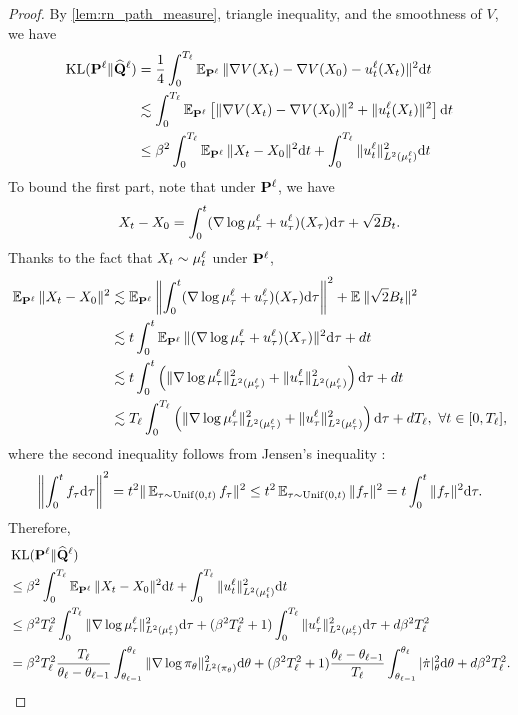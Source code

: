 \begin{proof}
    By \cref{lem:rn_path_measure}, triangle inequality, and the smoothness of $V$, we have
    \begin{align*}
        \operatorname{KL}(\mathbf{P}^\ell\|{\mathbf{\widehat{Q}}}^\ell) & =\frac{1}{4}\int_0^{T_\ell}\operatorname{\mathbb{E}}_{\mathbf{P}^\ell}{\|\nabla V(X_t)-\nabla V(X_0)-u^\ell_t(X_t)\|^2}\mathrm{d} t                \\
                               & \lesssim \int_0^{T_\ell}\operatorname{\mathbb{E}}_{\mathbf{P}^\ell}\left[\|\nabla V(X_t)-\nabla V(X_0)\|^2+\|u^\ell_t(X_t)\|^2\right]\mathrm{d} t       \\
                               & \le\beta^2\int_0^{T_\ell}\operatorname{\mathbb{E}}_{\mathbf{P}^\ell}{\|X_t-X_0\|^2}\mathrm{d} t+\int_0^{T_\ell}\|u^\ell_t\|_{L^2(\mu^\ell_t)}^2\mathrm{d} t
    \end{align*}
    To bound the first part, note that under $\mathbf{P}^\ell$, we have
    $$X_t-X_0=\int_0^t(\nabla\log\mu^\ell_\tau+u^\ell_\tau)(X_\tau)\mathrm{d}\tau+\sqrt2B_t.$$
    Thanks to the fact that $X_t\sim\mu^\ell_t$ under $\mathbf{P}^\ell$,
    \begin{align*}
        \operatorname{\mathbb{E}}_{\mathbf{P}^\ell}{\|X_t-X_0\|^2} & \lesssim\operatorname{\mathbb{E}}_{\mathbf{P}^\ell}{\left\|\int_0^t(\nabla\log\mu^\ell_\tau+u^\ell_\tau)(X_\tau)\mathrm{d}\tau\right\|^2}+\operatorname{\mathbb{E}}_{}{\|\sqrt2B_t\|^2}                                         \\
                                      & \lesssim t\int_0^t\operatorname{\mathbb{E}}_{\mathbf{P}^\ell}{\|(\nabla\log\mu^\ell_\tau+u^\ell_\tau)(X_\tau)\|^2}\mathrm{d}\tau+dt                                                                \\
                                      & \lesssim t\int_0^t\left(\|\nabla\log\mu^\ell_\tau\|^2_{L^2(\mu^\ell_\tau)}+\|u^\ell_\tau\|_{L^2(\mu^\ell_\tau)}^2\right)\mathrm{d}\tau+dt                                   \\
                                      & \lesssim T_\ell\int_0^{T_\ell}\left(\|\nabla\log\mu^\ell_\tau\|^2_{L^2(\mu^\ell_\tau)}+\|u^\ell_\tau\|_{L^2(\mu^\ell_\tau)}^2\right)\mathrm{d}\tau+dT_\ell,~\forall t\in[0,T_\ell],
    \end{align*}
    where the second inequality follows from Jensen's inequality \cite[Sec. 4]{cheng2018underdamped}:
    $$\left\|\int_0^t f_\tau\mathrm{d}\tau\right\|^2=t^2\|\operatorname{\mathbb{E}}_{\tau\sim\operatorname{Unif}(0,t)}{f_\tau}\|^2\le t^2\operatorname{\mathbb{E}}_{\tau\sim\operatorname{Unif}(0,t)}{\|f_\tau\|^2}=t\int_0^t\|f_\tau\|^2\mathrm{d}\tau.$$
    Therefore,
    \begin{align*}
        &\operatorname{KL}(\mathbf{P}^\ell\|{\mathbf{\widehat{Q}}}^\ell) \\
        &\le\beta^2\int_0^{T_\ell}\operatorname{\mathbb{E}}_{\mathbf{P}^\ell}{\|X_t-X_0\|^2}\mathrm{d} t+\int_0^{T_\ell}\|u^\ell_t\|_{L^2(\mu^\ell_t)}^2\mathrm{d} t                                                                                                                                                                     \\
                               & \le\beta^2T_\ell^2\int_0^{T_\ell}\|\nabla\log\mu^\ell_\tau\|^2_{L^2(\mu^\ell_\tau)}\mathrm{d}\tau+(\beta^2T_\ell^2+1)\int_0^{T_\ell}\|u^\ell_\tau\|_{L^2(\mu^\ell_\tau)}^2\mathrm{d}\tau+d\beta^2T_\ell^2                                                                                                 \\
                               & =\beta^2T_\ell^2\frac{T_\ell}{\theta_\ell-\theta_{\ell-1}}\int_{\theta_{\ell-1}}^{\theta_\ell}\|\nabla\log\pi_\theta\|^2_{L^2(\pi_\theta)}\mathrm{d}\theta+(\beta^2T_\ell^2+1)\frac{\theta_\ell-\theta_{\ell-1}}{T_\ell}\int_{\theta_{\ell-1}}^{\theta_\ell}|\dot\pi|_\theta^2\mathrm{d}\theta+d\beta^2T_\ell^2.
    \end{align*}


\end{proof}
